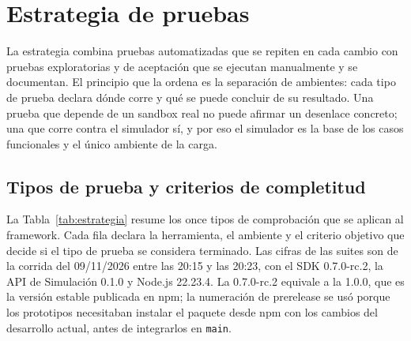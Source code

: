 \section{Estrategia de pruebas}
\label{sec:estrategia}

La estrategia combina pruebas automatizadas que se repiten en cada cambio con pruebas exploratorias y de aceptación que se ejecutan manualmente y se documentan. El principio que la ordena es la separación de ambientes: cada tipo de prueba declara dónde corre y qué se puede concluir de su resultado. Una prueba que depende de un sandbox real no puede afirmar un desenlace concreto; una que corre contra el simulador sí, y por eso el simulador es la base de los casos funcionales y el único ambiente de la carga.

\subsection{Tipos de prueba y criterios de completitud}

La Tabla~\ref{tab:estrategia} resume los once tipos de comprobación que se aplican al framework. Cada fila declara la herramienta, el ambiente y el criterio objetivo que decide si el tipo de prueba se considera terminado. Las cifras de las suites son de la corrida del 09/11/2026 entre las 20:15 y las 20:23, con el SDK 0.7.0-rc.2, la API de Simulación 0.1.0 y Node.js 22.23.4. La 0.7.0-rc.2 equivale a la 1.0.0, que es la versión estable publicada en npm; la numeración de prerelease se usó porque los prototipos necesitaban instalar el paquete desde npm con los cambios del desarrollo actual, antes de integrarlos en \texttt{main}.

